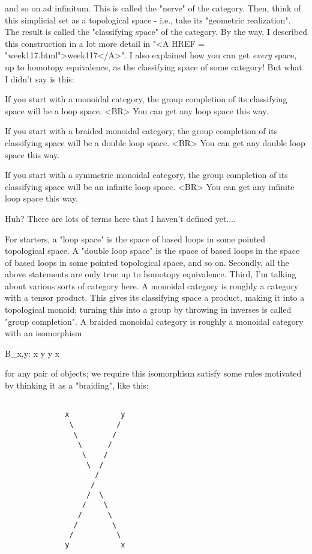 and so on ad infinitum.  This is called the "nerve" of the category.
Then, think of this simplicial set as a topological space - i.e., take
its "geometric realization".  The result is called the "classifying
space" of the category.  By the way, I described this construction in
a lot more detail in "<A HREF = "week117.html">week117</A>".  I also explained how you can get
\emph{every} space, up to homotopy equivalence, as the classifying space of
some category!  But what I didn't say is this:

If you start with a monoidal category, the group completion of 
its classifying space will be a loop space.  <BR>
You can get any loop space this way.

If you start with a braided monoidal category, the group completion of 
its classifying space will be a double loop space.  <BR>
You can get any double loop space this way.

If you start with a symmetric monoidal category, the group completion of
its classifying space will be an infinite loop space.  <BR>
You can get any infinite loop space this way.

Huh?  There are lots of terms here that I haven't defined yet....

For starters, a "loop space" is the space of based loops in some
pointed topological space.  A "double loop space" is the space of
based loops in the space of based loops in some pointed topological
space, and so on.  Secondly, all the above statements are only true up
to homotopy equivalence.  Third, I'm talking about various sorts of
category here.  A monoidal category is roughly a category with a
tensor product.  This gives its classifying space a product, making it
into a topological monoid; turning this into a group by throwing in
inverses is called "group completion".  A braided monoidal category is
roughly a monoidal category with an isomorphism

B_{x,y}: x \otimes  y \to  y \otimes  x

for any pair of objects; we require this isomorphism satisfy some rules 
motivated by thinking it as a "braiding", like this:


\begin{verbatim}

              x            y
               \          /
                \        /
                 \      /
                  \    /
                   \  /
                     /
                    /
                   /  \
                  /    \
                 /      \
                /        \
               /          \
              y            x
\end{verbatim}
    
